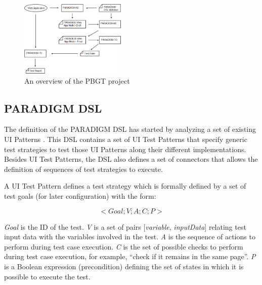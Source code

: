 \documentclass[conference]{IEEEtran}
\begin{document}
\begin{figure}[!htb]
\centering
\includegraphics[width=0.45\textwidth]{pbgt}
\caption{An overview of the PBGT project}
\label{fig:pbgt}
\end{figure}

\subsection{PARADIGM DSL}

The definition of the PARADIGM DSL has started by analyzing a set of existing UI Patterns \cite{van2001patterns}. This DSL contains a set of UI Test Patterns that specify generic test strategies to test those UI Patterns along their different implementations. Besides UI Test Patterns, the DSL also defines a set of connectors that allows the definition of sequences of test strategies to execute.

A UI Test Pattern defines a test strategy which is formally defined by a set of test goals (for later configuration) \cite{moreira2013pattern} with the form:

\begin{equation}< Goal; V; A; C; P >\end{equation}\label{eq:ui}

\textit{Goal} is the ID of the test. \textit{V} is a set of pairs { [\textit{variable}, \textit{inputData}] } relating test input data with the variables involved in the test. \textit{A} is the sequence of actions to perform during test case execution. \textit{C} is the set of possible checks to perform during test case execution, for example, “check if it remains in the same page”. \textit{P} is a Boolean expression (precondition) defining the set of states in which it is possible to execute the test.
\end{document}

